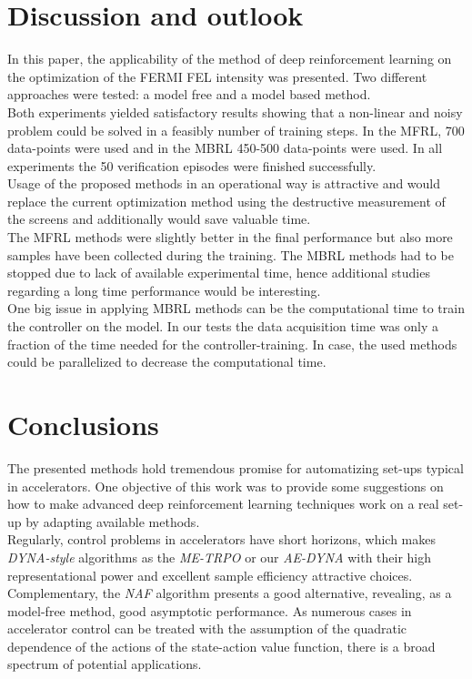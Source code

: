 \documentclass[
reprint,
amsmath,amssymb,amsfonts,clevref,
aps,
prstab,
]{revtex4-2}
\begin{document}
	\section{Discussion and outlook}
	In this paper, the applicability of the method of deep reinforcement learning on the optimization of the FERMI FEL intensity was presented. Two different approaches were tested: a model free and a model based method.\\
	 Both experiments yielded satisfactory results showing that a non-linear and noisy problem could be solved in a feasibly number of training steps. In the MFRL, 700 data-points were used and in the MBRL 450-500 data-points were used. In all experiments the 50 verification episodes were finished successfully.\\
	Usage of the proposed methods in an operational way is attractive and would replace the current optimization method using the destructive measurement of the screens and additionally would save valuable time.\\ 
	The MFRL methods were slightly better in the final performance but also more samples have been collected during the training. The MBRL methods had to be stopped due to lack of available experimental time, hence additional studies regarding a long time performance would be interesting.\\ One big issue in applying MBRL methods can be the computational time to train the controller on the model. In our tests the data acquisition time was only a fraction of the time needed for the controller-training. In case, the used methods could be parallelized to decrease the computational time.
	
\section{Conclusions}
 The presented methods hold tremendous promise for automatizing set-ups typical in accelerators. One objective of this work was to provide some suggestions on how to make advanced deep reinforcement learning techniques work on a real set-up by adapting available methods.\\
Regularly, control problems in accelerators have short horizons, which makes \emph{DYNA-style} algorithms as the \emph{ME-TRPO} or our \emph{AE-DYNA} with their high representational power and excellent sample efficiency attractive choices.\\
Complementary, the \emph{NAF} algorithm presents a good alternative, revealing, as a model-free method, good asymptotic performance. As numerous cases in accelerator control can be treated with the assumption of the quadratic dependence of the actions of the state-action value function, there is a broad spectrum of potential applications.\\
 
\end{document}
